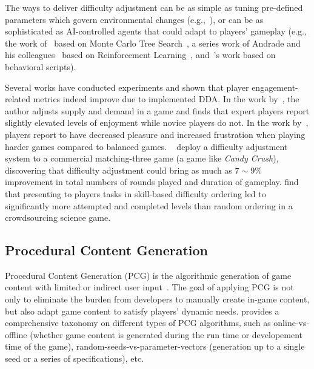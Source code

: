 The ways to deliver difficulty adjustment can be as simple as tuning pre-defined parameters which govern environmental changes (e.g.,~\cite{hunicke2005case,baldwin2014effect}), or can be as sophisticated as AI-controlled agents that could adapt to players' gameplay (e.g., the work of~\cite{demediuk2017monte} based on Monte Carlo Tree Search~\cite{browne2012survey}, a series work of Andrade and his colleagues~\cite{andrade2006dynamic,andrade2005challenge,andrade2005extending} based on Reinforcement Learning~\cite{sutton1998reinforcement}, and~\cite{spronck2004difficulty}'s work based on behavioral scripts). 

Several works have conducted experiments and shown that player engagement-related metrics indeed improve due to implemented DDA. In the work by~\cite{hunicke2005case}, the author adjusts supply and demand in a game and finds that expert players report slightly elevated levels of enjoyment while novice players do not. In the work by~\cite{van2009incongruity}, players report to have decreased pleasure and increased frustration when playing harder games compared to balanced games. ~\cite{xue2017dynamic} deploy a difficulty adjustment system to a commercial matching-three game (a game like \textit{Candy Crush}), discovering that difficulty adjustment could bring as much as $7 \sim 9 \%$ improvement in total numbers of rounds played and duration of gameplay. \cite{sarkar2017engagement} find that presenting to players 
tasks in skill-based difficulty ordering led to significantly more attempted and completed levels than random ordering in a crowdsourcing science game. 

\subsection{Procedural Content Generation}

Procedural Content Generation (PCG) is the algorithmic generation of game content with limited or indirect user input~\cite{yannakakis2011experience,togelius2011search}. The goal of applying PCG is not only to eliminate the burden from developers to manually create in-game content, but also adapt game content to satisfy players' dynamic needs. \cite{togelius2011search} provides a comprehensive taxonomy on different types of PCG algorithms, such as online-vs-offline (whether game content is generated during the run time or developement time of the game), random-seeds-vs-parameter-vectors (generation up to a single seed or a series of specifications), etc.

